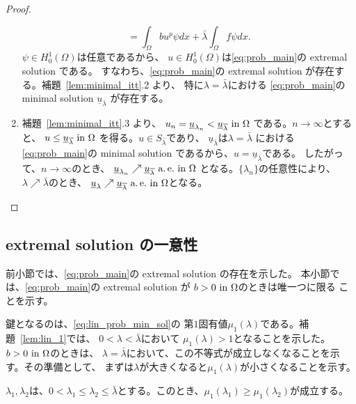 \begin{proof}
\begin{enumerate}[1.]
\[          = \int_\Omega bu^p \psi dx + \bar{\lambda} \int_\Omega f\psi dx.
        \]
        $\psi \in H_0^1(\Omega)$は任意であるから、
        $u \in H_0^1(\Omega)$は\ref{eq:prob_main}の extremal solution
        である。
        すなわち、\ref{eq:prob_main}の extremal solution
        が存在する。補題~\ref{lem:minimal_itt}.2 より、
        特に$\lambda = \bar{\lambda}$における
        \ref{eq:prob_main}の minimal solution 
        $\underline{u}_{\bar{\lambda}}$
        が存在する。
  \item 補題~\ref{lem:minimal_itt}.3 より、
        $u_n = \underline{u}_{\lambda_n} <
        \underline{u}_{\overline{\lambda}} ~\text{in}~ \Omega$
        である。$n \to \infty$とすると、
        $u \leq \underline{u}_{\overline{\lambda}} ~\text{in}~ \Omega$
        を得る。$u \in S_{\bar{\lambda}}$であり、
        $\underline{u}_{\bar{\lambda}}$は$\lambda = \bar{\lambda}$
        における \ref{eq:prob_main}の minimal solution 
        であるから、$u = \underline{u}_{\bar{\lambda}}$である。
        したがって、$n \to \infty$のとき、
        $\underline{u}_{\lambda_n} \nearrow
        \underline{u}_{\overline{\lambda}} ~\text{a.\,e.}~ \text{in}~ \Omega$
        となる。$\{ \lambda_n \}$の任意性により、
        $\lambda \nearrow \bar{\lambda}$のとき、
        $\underline{u}_{\lambda} \nearrow
        \underline{u}_{\overline{\lambda}} ~\text{a.\,e.}~ \text{in}~ \Omega$となる。\qedhere
 \end{enumerate}
\end{proof}

\subsection{extremal solution の一意性}

前小節では、\ref{eq:prob_main}の extremal solution の存在を示した。
本小節では、\ref{eq:prob_main}の extremal solution が
$b > 0 ~\text{in}~ \Omega$のときは唯一つに限る
ことを示す。

鍵となるのは、\eqref{eq:lin_prob_min_sol}の
第$1$固有値$\mu_1(\lambda)$である。補題~\ref{lem:lin_1}では、
$0 < \lambda < \bar{\lambda}$において
$\mu_1(\lambda) > 1$となることを示した。
$b > 0 ~\text{in}~ \Omega$のときは、
$\lambda = \bar{\lambda}$において、この不等式が成立しなくなることを示
す。その準備として、
まずは$\lambda$が大きくなると$\mu_1(\lambda)$が小さくなることを示す。

\begin{lem} \label{rem:mu1_dec}
 $\lambda_1, \lambda_2$は、$0 < \lambda_1 \leq \lambda_2 \leq
 \bar{\lambda}$とする。このとき、$\mu_1(\lambda_1) \geq
 \mu_1(\lambda_2)$が成立する。
\end{lem}

